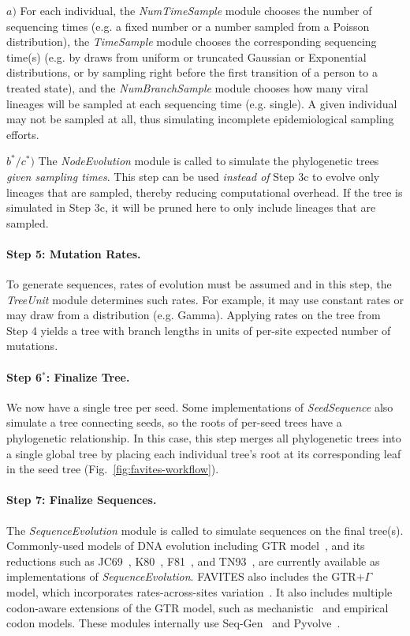 $a)$ For each individual, the \textit{NumTimeSample} module chooses the number of sequencing times (e.g. a fixed number or a number sampled from a Poisson distribution), the \textit{TimeSample} module chooses the corresponding sequencing time(s) (e.g. by draws from uniform or truncated Gaussian or Exponential distributions, or by sampling right before the first transition of a person to a treated state), and the \textit{NumBranchSample} module chooses how many viral lineages will be sampled at each sequencing time (e.g. single). A given individual may not be sampled at all, thus simulating incomplete epidemiological sampling efforts.

$b^*/c^*)$ The \textit{NodeEvolution} module is called to simulate the phylogenetic trees \textit{given sampling times}. 
This step can be used \textit{instead of} Step 3c to evolve only lineages that are sampled, thereby reducing computational overhead.
If the tree is simulated in Step 3c, it will be pruned here to only include lineages that are sampled.

\paragraph{Step 5: Mutation Rates.} To generate sequences, rates of evolution must be assumed and in this step, the \textit{TreeUnit} module determines such rates. For example, it may use constant rates or may draw from a distribution (e.g. Gamma). Applying rates on the tree from Step 4 yields a tree with branch lengths in units of per-site expected number of mutations.

\paragraph{Step 6$^*$: Finalize Tree.} We now have a single tree per seed. Some implementations of \textit{SeedSequence} also simulate a tree connecting seeds, so the roots of per-seed trees have a phylogenetic relationship. In this case,  this step merges all phylogenetic trees into a single global tree by placing each individual tree's root at its corresponding leaf in the seed tree (Fig.~\ref{fig:favites-workflow}).

\paragraph{Step 7: Finalize Sequences.} The \textit{SequenceEvolution} module is called to simulate sequences on the final tree(s). Commonly-used models of \gls{DNA} evolution including \gls{GTR} model~\cite{Tavare1986}, and its reductions such as \gls{JC69}~\cite{Jukes1969}, \gls{K80}~\cite{Kimura1980}, \gls{F81}~\cite{Felsenstein1981}, and \gls{TN93}~\cite{Tamura1993}, are currently available as implementations of \textit{SequenceEvolution}. FAVITES also includes the \gls{GTR}+$\Gamma$ model, which incorporates rates-across-sites variation~\cite{Yang1994}. It also includes multiple codon-aware extensions of the \gls{GTR} model, such as mechanistic~\cite{Zaheri2014} and empirical~\cite{Kosiol2007} codon models. These modules internally use Seq-Gen~\cite{Rambaut1997} and Pyvolve~\cite{Spielman2015}.

